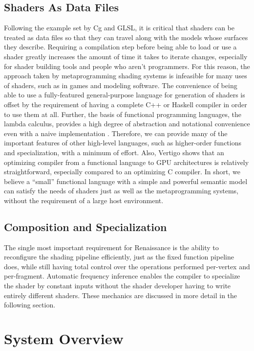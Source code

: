 \documentclass[review]{acmsiggraph}      %
\begin{document}
\subsection{Shaders As Data Files}

Following the example set by Cg and GLSL, it is critical that shaders
can be treated as data files so that they can travel along with the
models whose surfaces they describe.  Requiring a compilation step
before being able to load or use a shader greatly increases the amount
of time it takes to iterate changes, especially for shader building
tools and people who aren't programmers.  For this reason, the
approach taken by metaprogramming shading systems is infeasible for
many uses of shaders, such as in games and modeling software.  The
convenience of being able to use a fully-featured general-purpose
language for generation of shaders is offset by the requirement of
having a complete C++ or Haskell compiler in order to use them at all.
Further, the basis of functional programming languages, the lambda
calculus, provides a high degree of abstraction and notational
convenience even with a naive implementation
\cite{PeytonFunctional}.  Therefore, we can provide many of the
important features of other high-level languages, such as higher-order
functions and specialization, with a minimum of effort.  Also, Vertigo
shows that an optimizing compiler from a functional language to GPU
architectures is relatively straightforward, especially compared to an
optimizing C compiler.  In short, we believe a ``small'' functional
language with a simple and powerful semantic model can satisfy the
needs of shaders just as well as the metaprogramming systems, without
the requirement of a large host environment.


\subsection{Composition and Specialization}

The single most important requirement for Renaissance is the ability
to reconfigure the shading pipeline efficiently, just as the fixed
function pipeline does, while still having total control over the
operations performed per-vertex and per-fragment.  Automatic frequency
inference enables the compiler to specialize the shader by constant
inputs without the shader developer having to write entirely different
shaders.  These mechanics are discussed in more detail in the
following section.


\section{System Overview}
\end{document}
